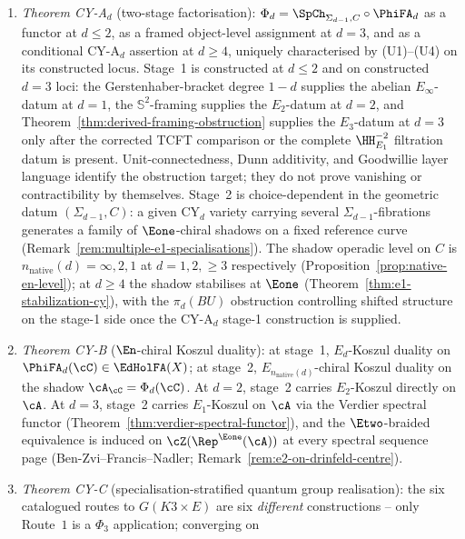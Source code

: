 \begin{enumerate}[label=\textup{(P\arabic*)},leftmargin=2em,
 topsep=0.3ex,itemsep=0.4ex]
 \item \emph{Theorem CY-A$_d$} (two-stage factorisation):
 $\Phi_d = \SpCh_{\Sigma_{d-1}, C}\circ\PhiFA_d$ as a functor at
 $d\leq2$, as a framed object-level assignment at $d=3$, and as a
 conditional CY-A$_d$ assertion at $d\geq4$, uniquely characterised by
 (U1)--(U4) on its constructed locus. Stage~1 is constructed at
 $d\leq2$ and on constructed $d=3$ loci: the
 Gerstenhaber-bracket degree $1 - d$ supplies the abelian
 $E_\infty$-datum at $d = 1$, the $\mathbb{S}^2$-framing
 supplies the $E_2$-datum at $d = 2$, and
 Theorem~\ref{thm:derived-framing-obstruction} supplies the
 $E_3$-datum at $d = 3$ only after the corrected TCFT comparison
 or the complete $\HH^{-2}_{E_1}$ filtration datum is present.
 Unit-connectedness, Dunn additivity, and Goodwillie layer language
 identify the obstruction target; they do not prove vanishing or
 contractibility by themselves. Stage~2 is choice-dependent in
 the geometric datum $(\Sigma_{d-1}, C)$: a given CY$_d$
 variety carrying several $\Sigma_{d-1}$-fibrations generates
 a family of $\Eone$-chiral shadows on a fixed reference
 curve (Remark~\ref{rem:multiple-e1-specialisations}). The
 shadow operadic level on $C$ is
 $n_{\mathrm{native}}(d) = \infty, 2, 1$ at $d = 1, 2, \geq 3$
 respectively
 (Proposition~\ref{prop:native-en-level}); at $d \geq 4$ the
 shadow stabilises at $\Eone$
 (Theorem~\ref{thm:e1-stabilization-cy}), with the
 $\pi_d(BU)$ obstruction controlling shifted structure on
 the stage-1 side once the CY-A$_d$ stage-1 construction is supplied.
 \item \emph{Theorem CY-B} ($\En$-chiral Koszul duality):
 at stage~1, $E_d$-Koszul duality on $\PhiFA_d(\cC) \in
 \EdHolFA(X)$; at stage~2, $E_{n_{\mathrm{native}}(d)}$-chiral
 Koszul duality on the shadow $\cA_\cC = \Phi_d(\cC)$. At
 $d = 2$, stage~2 carries $E_2$-Koszul directly on $\cA$.
 At $d = 3$, stage~2 carries $E_1$-Koszul on $\cA$ via the
 Verdier spectral functor
 (Theorem~\ref{thm:verdier-spectral-functor}), and the
 $\Etwo$-braided equivalence is induced on
 $\cZ(\Rep^{\Eone}(\cA))$ at every spectral sequence page
 (Ben-Zvi--Francis--Nadler; Remark~\ref{rem:e2-on-drinfeld-centre}).
 \item \emph{Theorem CY-C} (specialisation-stratified
 quantum group realisation): the six catalogued routes to
 $G(K3\times E)$ are six \emph{different} constructions --
 only Route~$1$ is a $\Phi_3$ application; converging on

\end{enumerate}
